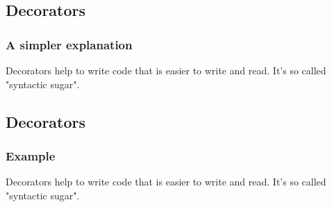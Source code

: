 \subsection{Decorators}
\begin{frame}
\frametitle{A simpler explanation}
Decorators help to write code that is easier to write and read.
It's so called "syntactic sugar".
\end{frame}

\subsection{Decorators}
\begin{frame}
\frametitle{Example}
Decorators help to write code that is easier to write and read.
It's so called "syntactic sugar".
\end{frame}




%
%    
%    
%
%
%	
